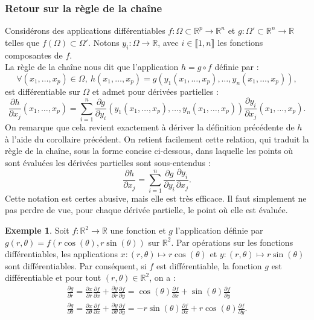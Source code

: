 \documentclass[french]{article}
\newcommand{\R}{\mathbb{R}}
\theoremstyle{plain}
\theoremstyle{definition}
\newtheorem*{ex}{Exemple}
\theoremstyle{remark}
\begin{document}
\subsubsection*{Retour sur la règle de la chaîne}

Considérons des applications différentiables $f:\Omega\subset\R^p\to\R^n$ et $g:\Omega'\subset\R^n\to\R$ telles que $f(\Omega)\subset\Omega'$. Notons $y_i:\Omega\to\R$, avec $i\in\llbracket1,n\rrbracket$ les fonctions composantes de $f$. \\
La règle de la chaîne nous dit que l'application $h=g\circ f$ définie par :
$$\forall (x_1,\ldots,x_p)\in\Omega,\ h(x_1,\ldots,x_p)=g(y_1(x_1,\ldots,x_p),\ldots,y_n(x_1,\ldots,x_p)),$$ est différentiable sur $\Omega$ et admet pour dérivées partielles :
$$\frac{\partial h}{\partial x_j}(x_1,\ldots,x_p)=\sum_{i=1}^{n}\frac{\partial g}{\partial y_i}(y_1(x_1,\ldots,x_p),\ldots,y_n(x_1,\ldots,x_p))\frac{\partial y_i}{\partial x_j}(x_1,\ldots,x_p).$$
On remarque que cela revient exactement à dériver la définition précédente de $h$ à l'aide du corollaire précédent. On retient facilement cette relation, qui traduit la règle de la chaîne, sous la forme concise ci-dessous, dans laquelle les points où sont évaluées les dérivées partielles sont sous-entendus :
$$\frac{\partial h}{\partial x_j}=\sum_{i=1}^{n}\frac{\partial g}{\partial y_i}\frac{\partial y_i}{\partial x_j}.$$
Cette notation est certes abusive, mais elle est très efficace. Il faut simplement ne pas perdre de vue, pour chaque dérivée partielle, le point où elle est évaluée.

\begin{ex}
	Soit $f:\R^2\to\R$ une fonction et $g$ l'application définie par $g(r,\theta)=f(r\cos(\theta),r\sin(\theta))$ sur $\R^2$. Par opérations sur les fonctions différentiables, les applications $x:(r,\theta)\mapsto r\cos(\theta)$ et $y:(r,\theta)\mapsto r\sin(\theta)$ sont différentiables. Par conséquent, si $f$ est différentiable, la fonction $g$ est différentiable et pour tout $(r,\theta)\in\R^2$, on a :
	\begin{align*}
		\frac{\partial g}{\partial r}=\frac{\partial x}{\partial r}\frac{\partial f}{\partial x}+\frac{\partial y}{\partial r}\frac{\partial f}{\partial y}=\cos(\theta)\frac{\partial f}{\partial x}+\sin(\theta)\frac{\partial f}{\partial y}\\[2mm]
		\frac{\partial g}{\partial \theta}=\frac{\partial x}{\partial \theta}\frac{\partial f}{\partial x}+\frac{\partial y}{\partial \theta}\frac{\partial f}{\partial y}=-r\sin(\theta)\frac{\partial f}{\partial x}+r\cos(\theta)\frac{\partial f}{\partial y}.
	\end{align*}
\end{ex}
\end{document}
